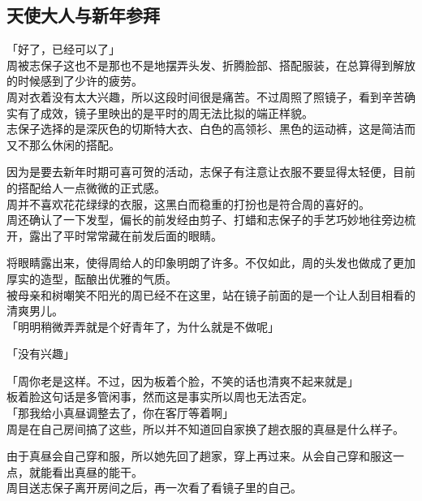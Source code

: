 \subsection{天使大人与新年参拜}

「好了，已经可以了」\\

周被志保子这也不是那也不是地摆弄头发、折腾脸部、搭配服装，在总算得到解放的时候感到了少许的疲劳。\\

周对衣着没有太大兴趣，所以这段时间很是痛苦。不过周照了照镜子，看到辛苦确实有了成效，镜子里映出的是平时的周无法比拟的端正样貌。\\

志保子选择的是深灰色的切斯特大衣、白色的高领衫、黑色的运动裤，这是简洁而又不那么休闲的搭配。

因为是要去新年时期可喜可贺的活动，志保子有注意让衣服不要显得太轻便，目前的搭配给人一点微微的正式感。\\

周并不喜欢花花绿绿的衣服，这黑白而稳重的打扮也是符合周的喜好的。\\

周还确认了一下发型，偏长的前发经由剪子、打蜡和志保子的手艺巧妙地往旁边梳开，露出了平时常常藏在前发后面的眼睛。

将眼睛露出来，使得周给人的印象明朗了许多。不仅如此，周的头发也做成了更加厚实的造型，酝酿出优雅的气质。\\

被母亲和树嘲笑不阳光的周已经不在这里，站在镜子前面的是一个让人刮目相看的清爽男儿。\\

「明明稍微弄弄就是个好青年了，为什么就是不做呢」

「没有兴趣」

「周你老是这样。不过，因为板着个脸，不笑的话也清爽不起来就是」\\

板着脸这句话是多管闲事，然而这是事实所以周也无法否定。\\

「那我给小真昼调整去了，你在客厅等着啊」\\

周是在自己房间搞了这些，所以并不知道回自家换了趟衣服的真昼是什么样子。

由于真昼会自己穿和服，所以她先回了趟家，穿上再过来。从会自己穿和服这一点，就能看出真昼的能干。\\

周目送志保子离开房间之后，再一次看了看镜子里的自己。\\

